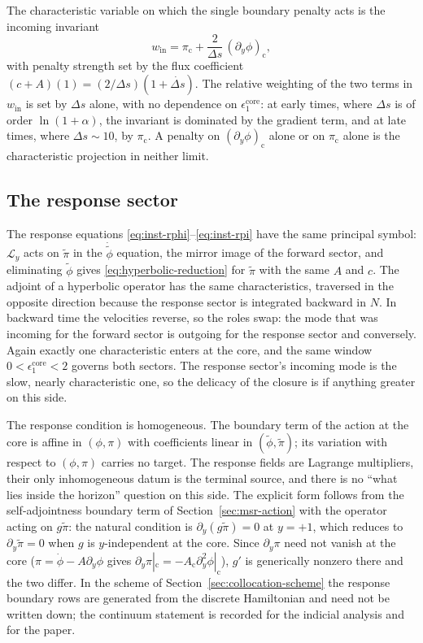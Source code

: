 \documentclass[a4paper,11pt]{article}
\newcommand{\Ny}{N}                          %
\newcommand{\epsSR}{\epsilon_1}              %
\newcommand{\field}{\phi}                    %
\newcommand{\mom}{\pi}                       %
\newcommand{\rfield}{\widetilde\field}       %
\newcommand{\rmom}{\widetilde\mom}           %
\newcommand{\yco}{y}                         %
\newcommand{\Deltas}{\Delta s}                %
\newcommand{\epscore}{\epsSR^{\mathrm{core}}} %
\newcommand{\advcoef}{A}                     %
\newcommand{\Lop}{\mathcal{L}_\yco}          %
\newcommand{\wspeed}{c}                       %
\newcommand{\win}{w_{\mathrm{in}}}            %
\newcommand{\gpref}{g}                        %
\newcommand{\core}{\mathrm{c}}                %
\begin{document}
The characteristic variable on which the single boundary penalty acts is
the incoming invariant
\begin{equation}
    \win = \mom_\core + \frac{2}{\Deltas}\,(\partial_\yco\field)_\core ,
    \label{eq:w-in}
\end{equation}
with penalty strength set by the flux coefficient
$(\wspeed+\advcoef)(1)=(2/\Deltas)(1+\dot{\Deltas})$. The relative
weighting of the two terms in $\win$ is set by $\Deltas$ alone, with no
dependence on $\epscore$: at early times, where $\Deltas$ is of order
$\ln(1+\alpha)$, the invariant is dominated by the gradient term, and at
late times, where $\Deltas\sim10$, by $\mom_\core$. A penalty on
$(\partial_\yco\field)_\core$ alone or on $\mom_\core$ alone is the
characteristic projection in neither limit.

\subsection{The response sector}

The response equations \eqref{eq:inst-rphi}--\eqref{eq:inst-rpi} have the
same principal symbol: $\Lop$ acts on $\rmom$ in the $\dot{\rfield}$
equation, the mirror image of the forward sector, and eliminating
$\rfield$ gives \eqref{eq:hyperbolic-reduction} for $\rmom$ with the same
$\advcoef$ and $\wspeed$. The adjoint of a hyperbolic operator has the
same characteristics, traversed in the opposite direction because the
response sector is integrated backward in $\Ny$. In backward time the
velocities reverse, so the roles swap: the mode that was incoming for the
forward sector is outgoing for the response sector and conversely. Again
exactly one characteristic enters at the core, and the same window
$0<\epscore<2$ governs both sectors. The response sector's incoming mode
is the slow, nearly characteristic one, so the delicacy of the closure is
if anything greater on this side.

The response condition is homogeneous. The boundary term of the action
at the core is affine in $(\field,\mom)$ with coefficients linear in
$(\rfield,\rmom)$; its variation with respect to $(\field,\mom)$ carries
no target. The response fields are Lagrange multipliers, their only
inhomogeneous datum is the terminal source, and there is no
``what lies inside the horizon'' question on this side. The explicit form
follows from the self-adjointness boundary term of
Section~\ref{sec:msr-action} with the operator acting on $\gpref\rmom$:
the natural condition is $\partial_\yco(\gpref\rmom)=0$ at $\yco=+1$, which
reduces to $\partial_\yco\rmom=0$ when $\gpref$ is $\yco$-independent at
the core. Since $\partial_\yco\mom$ need not vanish at the core
($\mom=\dot\field-\advcoef\partial_\yco\field$ gives
$\partial_\yco\mom|_\core=-\advcoef_\core\partial_\yco^2\field|_\core$),
$\gpref'$ is generically nonzero there and the two differ. In the scheme
of Section~\ref{sec:collocation-scheme} the response boundary rows are
generated from the discrete Hamiltonian and need not be written down; the
continuum statement is recorded for the indicial analysis and for the
paper.
\end{document}
